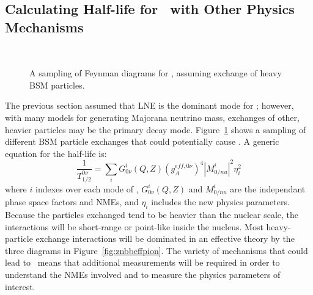 \documentclass[/main.tex]{subfiles}
\begin{document}
\subsection{Calculating Half-life for \znbb\ with Other Physics Mechanisms}
\begin{figure}[t]
  \centering
  \\
  \caption[\znbb\ Diagrams from Heavy BSM Mechanisms]{\label{fig:znbbheavy}
    A sampling of Feynman diagrams for \znbb, assuming exchange of heavy BSM particles.
  }
\end{figure}
The previous section assumed that LNE is the dominant mode for \znbb; however, with many models for generating Majorana neutrino mass, exchanges of other, heavier particles may be the primary decay mode.
Figure~\ref{fig:znbbheavy} shows a sampling of different BSM particle exchanges that could potentially cause \znbb.
A generic equation for the half-life is:
\begin{equation}
  \frac{1}{T^{0\nu}_{1/2}}=\sum_iG^i_{0\nu}(Q,Z)(g_A^{eff,0\nu})^4|M^i_{0/nu}|^2\eta_i^2
\end{equation}
where $i$ indexes over each mode of \znbb, $G^i_{0\nu}(Q,Z)$ and $M^i_{0/nu}$ are the independant phase space factors and NMEs, and $\eta_i$ includes the new physics parameters.
Because the particles exchanged tend to be heavier than the nuclear scale, the interactions will be short-range or point-like inside the nucleus.
Most heavy-particle exchange interactions will be dominated in an effective theory by the three diagrams in Figure~\ref{fig:znbbeffpion}.
The variety of mechanisms that could lead to \znbb\ means that additional measurements will be required in order to understand the NMEs involved and to measure the physics parameters of interest.
\end{document}

